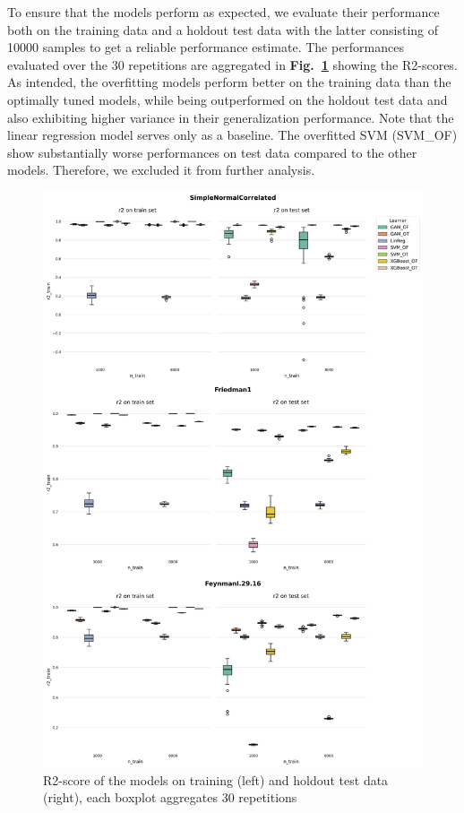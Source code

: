 \documentclass[runningheads]{llncs}
\begin{document}
To ensure that the models perform as expected, we evaluate their performance
both on the training data and a holdout test data with the latter consisting of
10000 samples to get a reliable performance estimate. The performances
evaluated over the 30 repetitions are aggregated in
\textbf{Fig.~\ref{fig:model-performance}} showing the R2-scores. As intended,
the overfitting models perform better on the training data than the optimally
tuned models, while being outperformed on the holdout test data and also
exhibiting higher variance in their generalization performance. Note that the
linear regression model serves only as a baseline. The overfitted SVM (SVM\_OF)
show substantially worse performances on test data compared to the other
models. Therefore, we excluded it from further analysis.

\begin{figure}
    \includegraphics[width=\textwidth]{img/model_performances.png}
    \caption{R2-score of the models on training (left) and holdout test data (right), each boxplot aggregates 30 repetitions}
    \label{fig:model-performance}
\end{figure}
\end{document}
